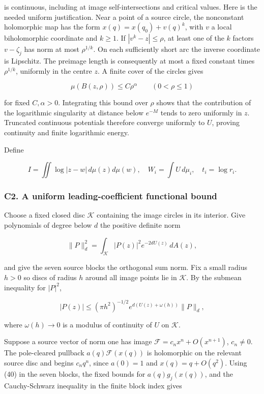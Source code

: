 \documentclass[11pt,a4paper]{article}
\begin{document}
is continuous, including at image self-intersections and critical values. Here is the needed uniform justification. Near a point of a source circle, the nonconstant holomorphic map has the form \(x(q)=x(q_{0})+v(q)^k\), with \(v\) a local biholomorphic coordinate and \(k≥1\). If \(|v^k-z|≤ρ\), at least one of the \(k\) factors \(v-ζ_j\) has norm at most \(ρ^{1/k}\). On each sufficiently short arc the inverse coordinate is Lipschitz. The preimage length is consequently at most a fixed constant times \(ρ^{1/k}\), uniformly in the centre \(z\). A finite cover of the circles gives

\[
\mu(B(z,\rho))\le C\rho^\alpha\qquad(0<\rho\le1)\tag{38}
\]

for fixed \(C,α>0\). Integrating this bound over \(ρ\) shows that the contribution of the logarithmic singularity at distance below \(e^{-M}\) tends to zero uniformly in \(z\). Truncated continuous potentials therefore converge uniformly to \(U\), proving continuity and finite logarithmic energy.

Define

\[
I=\iint\log|z-w|\,d\mu(z)d\mu(w),\quad
W_i=\int U\,d\mu_i,\quad t_i=\log r_i.
\]

\hypertarget{c2.-a-uniform-leading-coefficient-functional-bound}{%
\subsubsection{C2. A uniform leading-coefficient functional bound}\label{c2.-a-uniform-leading-coefficient-functional-bound}}

Choose a fixed closed disc \(\mathcal{K}\) containing the image circles in its interior. Give polynomials of degree below \(d\) the positive definite norm

\[
\|P\|_d^2=\int_{\mathcal K}|P(z)|^2e^{-2dU(z)}\,dA(z),\tag{39}
\]

and give the seven source blocks the orthogonal sum norm. Fix a small radius \(h>0\) so discs of radius \(h\) around all image points lie in \(\mathcal{K}\). By the submean inequality for \(|P|^{2}\),

\[
|P(z)|\le(\pi h^2)^{-1/2}e^{d(U(z)+\omega(h))}\|P\|_d,\tag{40}
\]

where \(ω(h)→0\) is a modulus of continuity of \(U\) on \(\mathcal{K}\).

Suppose a source vector of norm one has image \(\mathcal{F}=c_nx^n+O(x^{n+1})\), \(c_n≠0\). The pole-cleared pullback \(a(q)\mathcal{F}(x(q))\) is holomorphic on the relevant source disc and begins \(c_nq^n\), since \(a(0)=1\) and \(x(q)=q+O(q^{2})\). Using (40) in the seven blocks, the fixed bounds for \(a(q)g_j(x(q))\), and the Cauchy-Schwarz inequality in the finite block index gives
\end{document}
